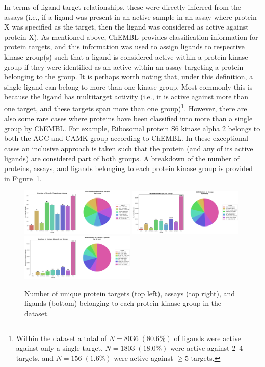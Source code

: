 \documentclass[11pt]{article}
\begin{document}
In terms of ligand-target relationships, these were directly inferred from the assays (i.e., if a ligand was present in an active sample in an assay where protein X was specified as the target, then the ligand was considered as active against protein X). 
As mentioned above, ChEMBL provides classification information for protein targets, and this information was used to assign ligands to respective kinase group(s) such that a ligand is considered active within a protein kinase group if they were identified as an active within an assay targeting a protein belonging to the group. 
It is perhaps worth noting that, under this definition, a single ligand can belong to more than one kinase group. 
Most commonly this is because the ligand has multitarget activity (i.e., it is active against more than one target, and these targets span more than one group)\footnote{Within the dataset a total of $N=8036 \; (80.6\%)$ of ligands were active against only a single target, $N=1803 \; (18.0\%)$ were active against 2--4 targets, and $N=156 \; (1.6\%)$ were active against $\geq 5$ targets.}. 
However, there are also some rare cases where proteins have been classified into more than a single group by ChEMBL. 
For example, \href{https://www.ebi.ac.uk/chembl/explore/target/CHEMBL3906}{Ribosomal protein S6 kinase alpha 2} belongs to both the AGC and CAMK group according to ChEMBL. 
In these exceptional cases an inclusive approach is taken such that the protein (and any of its active ligands) are considered part of both groups.  
A breakdown of the number of proteins, assays, and ligands belonging to each protein kinase group is provided in Figure~\ref{fig:group_atl_counts}. 


\begin{figure}[H]
    \centering 
    \includegraphics[width=0.49\textwidth]{../figures/ntarget_by_group.png}
    \includegraphics[width=0.49\textwidth]{../figures/nassay_by_group.png}
    \includegraphics[width=0.49\textwidth]{../figures/nligand_by_group.png}
    \caption{Number of unique protein targets (top left), assays (top right), and ligands (bottom) belonging to each protein kinase group in the dataset.}\label{fig:group_atl_counts}
\end{figure}
\end{document}
